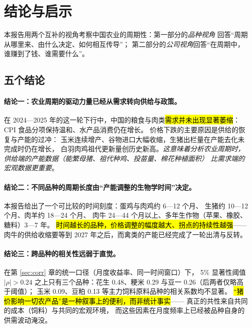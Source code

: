 \section{结论与启示}
\label{sec:conclusion}

本报告用两个互补的视角考察中国农业的周期性：第一部分的\emph{品种视角}
回答“周期从哪里来、由什么决定、如何相互传导”；
第二部分的\emph{公司视角}回答“在周期中，谁赚到了钱、谁需要什么”。

\subsection{五个结论}

\paragraph{结论一：农业周期的驱动力量已经从需求转向供给与政策。}
在 2024---2025 年的这一轮下行中，中国的粮食与肉类\hl{需求并未出现显著萎缩}：
CPI 食品分项保持温和、水产品消费仍在增长。
价格下跌的主要原因是供给的恢复与产能的过冲：
玉米连续增产、谷物进口大幅收缩，生猪出栏量在产能去化未完成时仍在增长，
白羽肉鸡祖代更新量创历史新高。\emph{这意味着分析农业周期时，
供给端的产能数据（能繁母猪、祖代种鸡、投苗量、棉花种植面积）
比需求端的宏观数据更重要}。

\paragraph{结论二：不同品种的周期长度由“产能调整的生物学时间”决定。}
本报告给出了一个可比较的时间刻度：蛋鸡与肉鸡约 \num{6}---\num{12} 个月、
生猪约 \num{10}---\num{12} 个月、肉羊约 \num{18}---\num{24} 个月、
肉牛 \num{24}---\num{44} 个月以上、多年生作物（苹果、橡胶、糖料）\num{3}---\num{7} 年。
\hl{时间越长的品种，价格调整的幅度越大、拐点的持续性越强}——
肉牛的供给收缩要等到 2027 年之后，而禽类的产能已经完成了一轮出清与反转。

\paragraph{结论三：跨品种的相关性远弱于直觉。}
在第 \ref{sec:corr} 章的统一口径（月度收益率、同一时间窗口）下，
5\% 显著性阈值 $|\rho|>0.24$ 之上只有三个品种：花生 \num{+0.48}、粳米 \num{+0.29}
与豆一 \num{+0.26}（后两者仅略高于阈值）；
玉米 \num{+0.09}、豆粕 \num{+0.13} 等主力饲料原料品种的相关系数均不显著。
\hl{“猪价影响一切农产品”是一种叙事上的便利，而非统计事实}——
真正的共性来自共同的成本（饲料）与共同的宏观环境，
而这些因素在月度频率上已经被品种自身的供需波动淹没。

